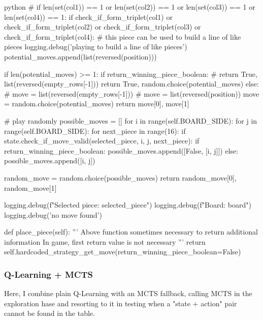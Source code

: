 \begin{mintedbox}{python}
                    # if len(set(col1)) == 1 or len(set(col2)) == 1 or len(set(col3)) == 1 or len(set(col4)) == 1:
                    if check_if_form_triplet(col1) or check_if_form_triplet(col2) or check_if_form_triplet(col3) or check_if_form_triplet(col4):
                        # this piece can be used to build a line of like pieces
                        logging.debug('playing to build a line of like pieces')
                        potential_moves.append(list(reversed(position)))

                    if len(potential_moves) >= 1:
                        if return_winning_piece_boolean:
                            # return True, list(reversed(empty_rows[-1]))
                            return True, random.choice(potential_moves)
                        else:
                            # move = list(reversed(empty_rows[-1]))
                            # move = list(reversed(position))
                            move = random.choice(potential_moves)
                            return move[0], move[1]

        # play randomly
        possible_moves = []
        for i in range(self.BOARD_SIDE):
            for j in range(self.BOARD_SIDE):
                for next_piece in range(16):
                    if state.check_if_move_valid(selected_piece, i, j, next_piece):
                        if return_winning_piece_boolean:
                            possible_moves.append([False, [i, j]])
                        else:
                            possible_moves.append([i, j])

        random_move = random.choice(possible_moves)
        return random_move[0], random_move[1]

        logging.debug(f"Selected piece: {selected_piece}")
        logging.debug(f"Board: {board}")
        logging.debug('no move found')

    def place_piece(self):
        '''
        Above function sometimes necessary to return additional information
        In game, first return value is not necessary
        '''
        return self.hardcoded_strategy_get_move(return_winning_piece_boolean=False)
\end{mintedbox}

\subsubsection{Q-Learning + MCTS}

Here, I combine plain Q-Learning with an MCTS fallback, calling MCTS in the exploration hase and resorting to it in testing when a "state + action" pair cannot be found in the table.

